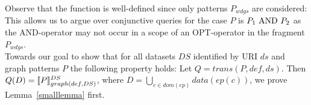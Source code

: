\begin{enumerate}
\end{enumerate}
Observe that the function is well-defined since only patterns $P_{wdgs}$ are
considered: This allows us to argue over conjunctive queries for the case $P$ is $P_1
\mbox{ AND } P_2$ as the AND-operator may not occur in a scope of an OPT-operator in the fragment
$P_{wdgs}$. \\
Towards our goal to show that for all datasets $DS$ identified by URI
$ds$ and graph patterns $P$ the following property holds: 
Let $Q = trans(P,def,ds)$. Then $Q(D) = \llbracket P
\rrbracket^{DS}_{graph(def,DS)}$, where $D=\bigcup\limits_{c \in dom(ep)} data(ep(c))$, we prove Lemma~\ref{smalllemma} first.

